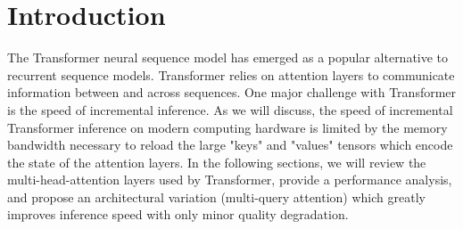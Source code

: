 \documentclass{article}
\title{\vspace{-2em}%
  \hrule height 4pt%
  \vskip 0.25in%
  \vskip -\parskip%
  \textbf{
  Fast Transformer Decoding: One Write-Head is All You Need
  }%
  \vskip 0.2in%
  \vskip -\parskip%
  \hrule height 1pt%
  \vskip 0.09in}
\author{Noam Shazeer \\ Google \\ noam@google.com}
\begin{document}
\maketitle




\begin{abstract}

Multi-head attention layers, as used in the Transformer neural sequence model, are a powerful alternative to RNNs for moving information across and between sequences.  While training these layers is generally fast and simple, due to parallelizability across the length of the sequence, incremental inference (where such paralleization is impossible) is often slow, due to the memory-bandwidth cost of repeatedly loading the large "keys" and "values" tensors. We propose a variant called multi-query attention, where the keys and values are shared across all of the different attention "heads", greatly reducing the size of these tensors and hence the memory bandwidth requirements of incremental decoding.  We verify experimentally that the resulting models can indeed be much faster to decode, and incur only minor quality degradation from the baseline.

\end{abstract}


\section{Introduction}
The Transformer neural sequence model \citep{Vas17} has emerged as a popular alternative to recurrent sequence models.  Transformer relies on attention layers to communicate information between and across sequences.  One major challenge with Transformer is the speed of incremental inference.  As we will discuss, the speed of incremental Transformer inference on modern computing hardware is limited by the memory bandwidth necessary to reload the large "keys" and "values" tensors which encode the state of the attention layers.  In the following sections, we will review the multi-head-attention layers used by Transformer, provide a performance analysis, and propose an architectural variation (multi-query attention) which greatly improves inference speed with only minor quality degradation.
\end{document}
